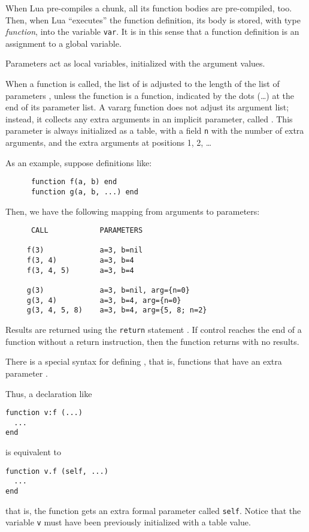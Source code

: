 When Lua pre-compiles a chunk,
all its function bodies are pre-compiled, too.
Then, when Lua ``executes'' the function definition,
its body is stored, with type \emph{function},
into the variable \verb|var|.
It is in this sense that
a function definition is an assignment to a global variable.

Parameters act as local variables,
initialized with the argument values.
\begin{Produc}
\end{Produc}
\label{vararg}
When a function is called,
the list of  is adjusted to
the length of the list of parameters ,
unless the function is a  function,
indicated by the dots (\ldots) at the end of its parameter list.
A vararg function does not adjust its argument list;
instead, it collects any extra arguments in an implicit parameter,
called .
This parameter is always initialized as a table,
with a field \verb|n| with the number of extra arguments,
and the extra arguments at positions 1, 2, \ldots

As an example, suppose definitions like:
\begin{verbatim}
      function f(a, b) end
      function g(a, b, ...) end
\end{verbatim}
Then, we have the following mapping from arguments to parameters:
\begin{verbatim}
      CALL            PARAMETERS

     f(3)             a=3, b=nil
     f(3, 4)          a=3, b=4
     f(3, 4, 5)       a=3, b=4

     g(3)             a=3, b=nil, arg={n=0}
     g(3, 4)          a=3, b=4, arg={n=0}
     g(3, 4, 5, 8)    a=3, b=4, arg={5, 8; n=2}
\end{verbatim}

Results are returned using the \verb|return| statement .
If control reaches the end of a function without a return instruction,
then the function returns with no results.

There is a special syntax for defining ,
that is, functions that have an extra parameter .
\begin{Produc}
\end{Produc}%
Thus, a declaration like
\begin{verbatim}
function v:f (...)
  ...
end
\end{verbatim}
is equivalent to
\begin{verbatim}
function v.f (self, ...)
  ...
end
\end{verbatim}
that is, the function gets an extra formal parameter called \verb|self|.
Notice that
the variable \verb|v| must have been
previously initialized with a table value.


